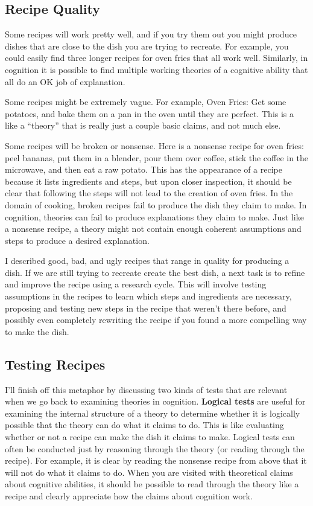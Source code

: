 \documentclass[
  oneside,
  12pt]{crumpbook}
\begin{document}
\hypertarget{recipe-quality}{%
\subsection{Recipe Quality}\label{recipe-quality}}

Some recipes will work pretty well, and if you try them out you might produce dishes that are close to the dish you are trying to recreate. For example, you could easily find three longer recipes for oven fries that all work well. Similarly, in cognition it is possible to find multiple working theories of a cognitive ability that all do an OK job of explanation.

Some recipes might be extremely vague. For example, Oven Fries: Get some potatoes, and bake them on a pan in the oven until they are perfect. This is a like a ``theory'' that is really just a couple basic claims, and not much else.

Some recipes will be broken or nonsense. Here is a nonsense recipe for oven fries: peel bananas, put them in a blender, pour them over coffee, stick the coffee in the microwave, and then eat a raw potato. This has the appearance of a recipe because it lists ingredients and steps, but upon closer inspection, it should be clear that following the steps will not lead to the creation of oven fries. In the domain of cooking, broken recipes fail to produce the dish they claim to make. In cognition, theories can fail to produce explanations they claim to make. Just like a nonsense recipe, a theory might not contain enough coherent assumptions and steps to produce a desired explanation.

I described good, bad, and ugly recipes that range in quality for producing a dish. If we are still trying to recreate create the best dish, a next task is to refine and improve the recipe using a research cycle. This will involve testing assumptions in the recipes to learn which steps and ingredients are necessary, proposing and testing new steps in the recipe that weren't there before, and possibly even completely rewriting the recipe if you found a more compelling way to make the dish.

\hypertarget{testing-recipes}{%
\subsection{Testing Recipes}\label{testing-recipes}}

I'll finish off this metaphor by discussing two kinds of tests that are relevant when we go back to examining theories in cognition. \textbf{Logical tests} are useful for examining the internal structure of a theory to determine whether it is logically possible that the theory can do what it claims to do. This is like evaluating whether or not a recipe can make the dish it claims to make. Logical tests can often be conducted just by reasoning through the theory (or reading through the recipe). For example, it is clear by reading the nonsense recipe from above that it will not do what it claims to do. When you are visited with theoretical claims about cognitive abilities, it should be possible to read through the theory like a recipe and clearly appreciate how the claims about cognition work.
\end{document}

